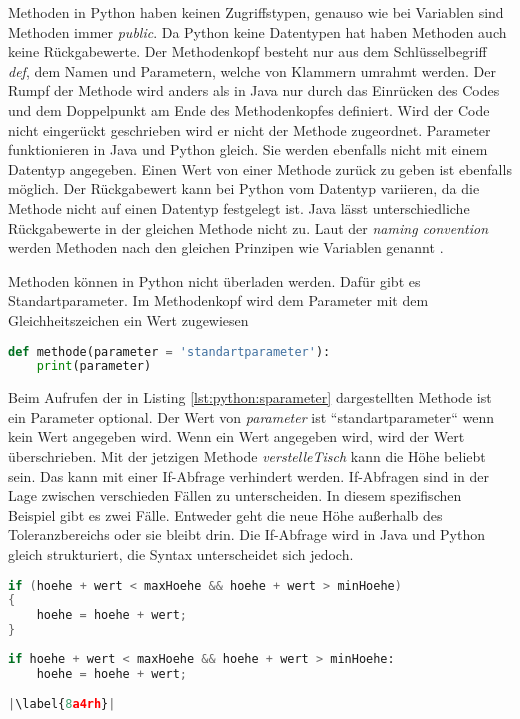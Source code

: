 Methoden in Python haben keinen Zugriffstypen, genauso wie bei Variablen sind Methoden immer \textit{public}. Da Python keine Datentypen hat haben Methoden auch keine Rückgabewerte. Der Methodenkopf besteht nur aus dem Schlüsselbegriff \textit{def}, dem Namen und Parametern, welche von Klammern umrahmt werden. Der Rumpf der Methode wird anders als in Java nur durch das Einrücken des Codes und dem Doppelpunkt am Ende des Methodenkopfes definiert. Wird der Code nicht eingerückt geschrieben wird er nicht der Methode zugeordnet. Parameter funktionieren in Java und Python gleich. Sie werden ebenfalls nicht mit einem Datentyp angegeben. Einen Wert von einer Methode zurück zu geben ist ebenfalls möglich. Der Rückgabewert kann bei Python vom Datentyp variieren, da die Methode nicht auf einen Datentyp festgelegt ist. Java lässt unterschiedliche Rückgabewerte in der gleichen Methode nicht zu. Laut der \textit{naming convention} werden Methoden nach den gleichen Prinzipen wie Variablen genannt \cite{Ims:h-s}\cite{Microsoft:CapCon}. \cite{Python3:Buch}\cite{Louis:2010}\par
Methoden können in Python nicht überladen werden. Dafür gibt es Standartparameter. Im Methodenkopf wird dem Parameter mit dem Gleichheitszeichen ein Wert zugewiesen

\begin{lstlisting}[language=python,caption={Methode in Python mit Standartparameter},captionpos=b,label={lst:python:sparameter},frame=none]
def methode(parameter = 'standartparameter'):
    print(parameter)
\end{lstlisting}

Beim Aufrufen der in Listing \ref{lst:python:sparameter} dargestellten Methode ist ein Parameter optional. Der Wert von \textit{parameter} ist “standartparameter“ wenn kein Wert angegeben wird. Wenn ein Wert angegeben wird, wird der Wert überschrieben.
Mit der jetzigen Methode \textit{verstelleTisch} kann die Höhe beliebt sein. Das kann mit einer If-Abfrage verhindert werden. If-Abfragen sind in der Lage zwischen verschieden Fällen zu unterscheiden. In diesem spezifischen Beispiel gibt es zwei Fälle. Entweder geht die neue Höhe außerhalb des Toleranzbereichs oder sie bleibt drin. Die If-Abfrage wird in Java und Python gleich strukturiert, die Syntax unterscheidet sich jedoch. \cite{Python3:Buch}\cite{Louis:2010}

\begin{minipage}{.5\linewidth}
\begin{lstlisting}[language=java,caption={If-Abfrage in Java},captionpos=b,label={lst:java:if},frame=none]
if (hoehe + wert < maxHoehe && hoehe + wert > minHoehe)
{
    hoehe = hoehe + wert;
}
\end{lstlisting}
\end{minipage}
\begin{minipage}{.5\linewidth}
\begin{lstlisting}[language=python,caption={If-Abfrage in Python},captionpos=b,label={lst:python:if},frame=l,escapechar=|]
if hoehe + wert < maxHoehe && hoehe + wert > minHoehe:
    hoehe = hoehe + wert;
    
|\label{8a4rh}|
\end{lstlisting}
\end{minipage}

